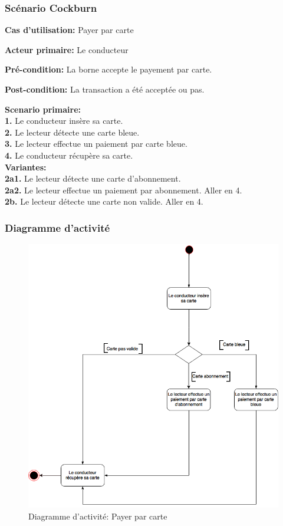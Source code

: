 \subsubsection{Scénario Cockburn}
\textbf{Cas d'utilisation:} Payer par carte

\textbf{Acteur primaire:} Le conducteur

\textbf{Pré-condition: } La borne accepte le payement par carte.
 
\textbf{Post-condition: }  La transaction a été acceptée ou pas.

\textbf{Scenario primaire: } \\
    \textbf{1.} Le conducteur insère sa carte. \\
    \textbf{2.} Le lecteur détecte une carte bleue. \\
    \textbf{3.} Le lecteur effectue un paiement par carte bleue.\\
    \textbf{4.} Le conducteur récupère sa carte.\\

\textbf{Variantes:}\\
    \textbf{2a1.} Le lecteur détecte une carte d’abonnement.\\
    \textbf{2a2.} Le lecteur effectue un paiement par abonnement. Aller en 4.\\
    \textbf{2b.} Le lecteur détecte une carte non valide.  Aller en 4. \\
    
\newpage
\subsubsection{Diagramme d'activité}
\begin{figure}[h]
    \centering
    \includegraphics[scale=0.45]{02_Desenvolvimento/TD2/images/DA-PayerCarte.png}
    \caption{Diagramme d'activité: Payer par carte}
\end{figure}
\newpage
